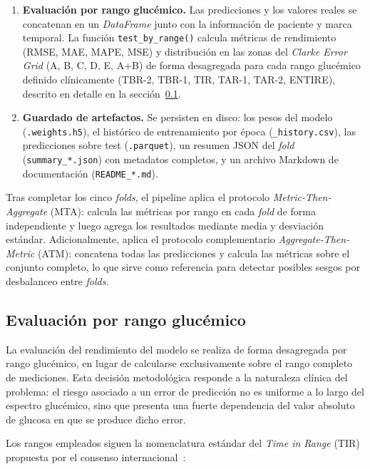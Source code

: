 \begin{enumerate}
    \item \textbf{Evaluación por rango glucémico.} Las predicciones y los valores reales se concatenan en un \textit{DataFrame} junto con la información de paciente y marca temporal. La función \texttt{test\_by\_range()} calcula métricas de rendimiento (RMSE, MAE, MAPE, MSE) y distribución en las zonas del \textit{Clarke Error Grid} (A, B, C, D, E, A+B) de forma desagregada para cada rango glucémico definido clínicamente (TBR-2, TBR-1, TIR, TAR-1, TAR-2, ENTIRE), descrito en detalle en la sección~\ref{subsec:evaluacion_por_rango}.

    \item \textbf{Guardado de artefactos.} Se persisten en disco: los pesos del modelo (\texttt{.weights.h5}), el histórico de entrenamiento por época (\texttt{\_history.csv}), las predicciones sobre test (\texttt{.parquet}), un resumen JSON del \textit{fold} (\texttt{summary\_*.json}) con metadatos completos, y un archivo Markdown de documentación (\texttt{README\_*.md}).
\end{enumerate}

Tras completar los cinco \textit{folds}, el pipeline aplica el protocolo \textit{Metric-Then-Aggregate} (MTA): calcula las métricas por rango en cada \textit{fold} de forma independiente y luego agrega los resultados mediante media y desviación estándar. Adicionalmente, aplica el protocolo complementario \textit{Aggregate-Then-Metric} (ATM): concatena todas las predicciones y calcula las métricas sobre el conjunto completo, lo que sirve como referencia para detectar posibles sesgos por desbalanceo entre \textit{folds}.

\subsection{Evaluación por rango glucémico}
\label{subsec:evaluacion_por_rango}

La evaluación del rendimiento del modelo se realiza de forma desagregada por rango glucémico, en lugar de calcularse exclusivamente sobre el rango completo de mediciones. Esta decisión metodológica responde a la naturaleza clínica del problema: el riesgo asociado a un error de predicción no es uniforme a lo largo del espectro glucémico, sino que presenta una fuerte dependencia del valor absoluto de glucosa en que se produce dicho error.

Los rangos empleados siguen la nomenclatura estándar del \textit{Time in Range} (TIR) propuesta por el consenso internacional~\cite{battelino2019clinical}:

